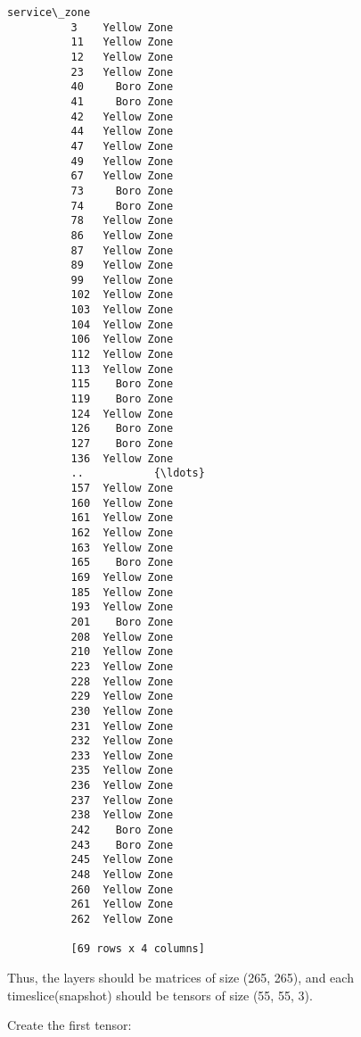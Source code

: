 \documentclass[11pt]{article}
\begin{document}
\begin{Verbatim}[commandchars=\\\{\}]
              service\_zone  
          3    Yellow Zone  
          11   Yellow Zone  
          12   Yellow Zone  
          23   Yellow Zone  
          40     Boro Zone  
          41     Boro Zone  
          42   Yellow Zone  
          44   Yellow Zone  
          47   Yellow Zone  
          49   Yellow Zone  
          67   Yellow Zone  
          73     Boro Zone  
          74     Boro Zone  
          78   Yellow Zone  
          86   Yellow Zone  
          87   Yellow Zone  
          89   Yellow Zone  
          99   Yellow Zone  
          102  Yellow Zone  
          103  Yellow Zone  
          104  Yellow Zone  
          106  Yellow Zone  
          112  Yellow Zone  
          113  Yellow Zone  
          115    Boro Zone  
          119    Boro Zone  
          124  Yellow Zone  
          126    Boro Zone  
          127    Boro Zone  
          136  Yellow Zone  
          ..           {\ldots}  
          157  Yellow Zone  
          160  Yellow Zone  
          161  Yellow Zone  
          162  Yellow Zone  
          163  Yellow Zone  
          165    Boro Zone  
          169  Yellow Zone  
          185  Yellow Zone  
          193  Yellow Zone  
          201    Boro Zone  
          208  Yellow Zone  
          210  Yellow Zone  
          223  Yellow Zone  
          228  Yellow Zone  
          229  Yellow Zone  
          230  Yellow Zone  
          231  Yellow Zone  
          232  Yellow Zone  
          233  Yellow Zone  
          235  Yellow Zone  
          236  Yellow Zone  
          237  Yellow Zone  
          238  Yellow Zone  
          242    Boro Zone  
          243    Boro Zone  
          245  Yellow Zone  
          248  Yellow Zone  
          260  Yellow Zone  
          261  Yellow Zone  
          262  Yellow Zone  
          
          [69 rows x 4 columns]
\end{Verbatim}
            
    Thus, the layers should be matrices of size (265, 265), and each
timeslice(snapshot) should be tensors of size (55, 55, 3).

Create the first tensor:
\end{document}
